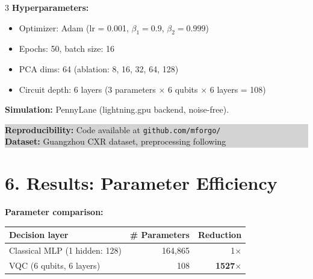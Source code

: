 \documentclass[a0,portrait]{a0poster}
\begin{document}
\begin{multicols}{3}
\noindent
\textbf{Hyperparameters:}
\begin{itemize}[leftmargin=0.9em,itemsep=0.1em,topsep=0.1em]
\item Optimizer: Adam (lr = 0.001, \(\beta_1=0.9\), \(\beta_2=0.999\))
\item Epochs: 50, batch size: 16
\item PCA dims: 64 (ablation: 8, 16, 32, 64, 128)
\item Circuit depth: 6 layers (3 parameters \(\times\) 6 qubits \(\times\) 6 layers = 108)
\end{itemize}

\noindent
\textbf{Simulation:} PennyLane (lightning.gpu backend, noise-free).

\begin{center}
\colorbox{LightGrey}{
\begin{minipage}{0.95\columnwidth}
\small
\textbf{Reproducibility:} Code available at \texttt{github.com/mforgo/}\\
\textbf{Dataset:} Guangzhou CXR dataset, preprocessing following \cite{Kundu2021}
\end{minipage}
}
\end{center}


\color{UWBBlue}\section*{6. Results: Parameter Efficiency}
\color{TechGrey}

\noindent
\textbf{Parameter comparison:}

\begin{center}
\begin{tabular}{lrr}
\toprule
\textbf{Decision layer} & \textbf{\# Parameters} & \textbf{Reduction} \\
\midrule
Classical MLP (1 hidden: 128) & 164,865 & 1\(\times\) \\
VQC (6 qubits, 6 layers) & 108 & \textbf{\textcolor{NTCPurple2}{1527\(\times\)}} \\
\bottomrule
\end{tabular}
\end{center}

\vspace{0.2cm}


\end{multicols}
\end{document}
